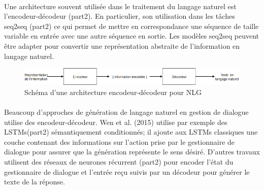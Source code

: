 \paragraph{}
Une architecture souvent utilisée dans le traitement du langage naturel est l’encodeur-décodeur (part2). En particulier, son utilisation dans les tâches seq2seq (part2) ce qui permet de mettre en correspondance une séquence de taille variable en entrée avec une autre séquence en sortie. Les modèles seq2seq peuvent être adapter pour convertir une représentation abstraite de l’information en langage naturel\cite{Ferreira2017}.\newline
\begin{figure}[H]
	\centering
	\includegraphics[width=.95\linewidth]{images/NLG/Encoder.png} 
	\caption{Schéma d'une architecture encodeur-décodeur pour NLG} 
\end{figure}
\paragraph{}
Beaucoup d’approches de génération de langage naturel en gestion de dialogue utilise des encodeur-décodeur. Wen et al. (2015)\cite{Wen2015} utilise par exemple des LSTMs(part2) sémantiquement conditionnés; il ajoute aux LSTMs classiques une couche contenant des informations sur l’action prise par le gestionnaire de dialogue pour assurer que la génération représente le sens désiré. D’autres travaux utilisent des réseaux de neurones récurrent (part2) pour encoder l’état du gestionnaire de dialogue et l’entrée reçu suivis par un décodeur pour générer le texte de la réponse\cite{Sordoni2015,Serban2016,Goyal2016}.
	